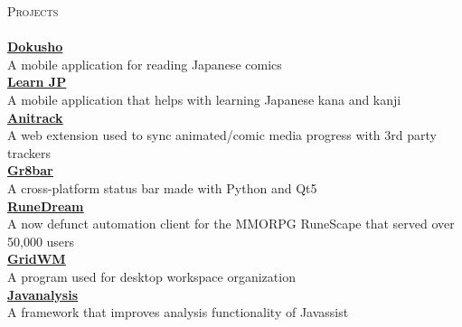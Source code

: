 \documentclass[a4paper]{article}
\newcommand{\lineunder} {
    \vspace*{-8pt} \\
    \hspace*{-18pt} \hrulefill \\
}
\newcommand{\header} [1] {
    {\hspace*{-18pt}\vspace*{6pt} \textsc{#1}}
    \vspace*{-6pt} \lineunder
}
\begin{document}
\header{Projects}
{\textbf{\href{https://github.com/TSedlar/dokusho}{\ul{Dokusho}}}}\\
\vspace*{1mm}
A mobile application for reading Japanese comics\\
\vspace*{2mm}
{\textbf{\href{https://itunes.apple.com/us/app/learn-jp/id1447060691}{\ul{Learn JP}}}}\\
\vspace*{1mm}
A mobile application that helps with learning Japanese kana and kanji\\
\vspace*{2mm}
{\textbf{\href{https://github.com/TSedlar/anitrack}{\ul{Anitrack}}}}\\
\vspace*{1mm}
A web extension used to sync animated/comic media progress with 3rd party trackers\\
\vspace*{2mm}
{\textbf{\href{https://github.com/TSedlar/gr8bar}{\ul{Gr8bar}}}}\\
\vspace*{1mm}
A cross-platform status bar made with Python and Qt5\\
\vspace*{2mm}
{\textbf{\href{https://github.com/FThompson/RuneDream-API}{\ul{RuneDream}}}}\\
\vspace*{1mm}
A now defunct automation client for the MMORPG RuneScape that served over 50,000 users\\
\vspace*{2mm}
{\textbf{\href{https://github.com/TSedlar/GridWM}{\ul{GridWM}}}}\\
\vspace*{1mm}
A program used for desktop workspace organization\\
\vspace*{2mm}
{\textbf{\href{https://github.com/disassemble-io/javanalysis}{\ul{Javanalysis}}}}\\
\vspace*{1mm}
A framework that improves analysis functionality of Javassist\\
\vspace*{2mm}
\end{document}
